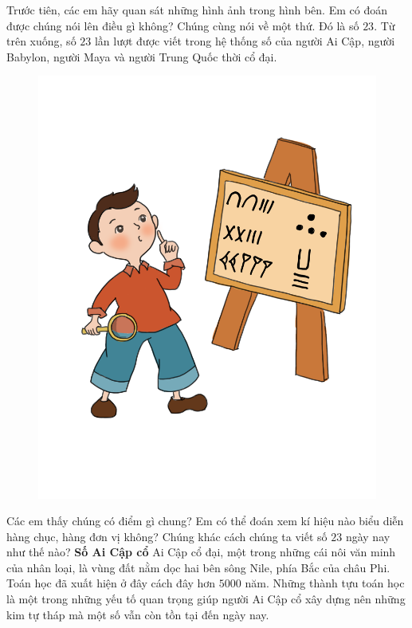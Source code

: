 	Trước tiên, các em hãy quan sát những hình ảnh trong hình bên.  Em có đoán được chúng nói lên điều gì không? Chúng cùng nói về  một thứ. Đó là số $23$. Từ trên xuống, số $23$ lần lượt được viết trong hệ thống số của người Ai Cập, người Babylon, người Maya và người Trung Quốc thời cổ đại. 
	\vskip 0.1cm
		\begin{figure}
		\centering
		\vspace*{-20pt}
		\captionsetup{labelformat= empty, justification=centering}
		\includegraphics[width=1\linewidth]{20.12-pi}
		\vspace*{-35pt}
	\end{figure}
	Các em thấy chúng có điểm gì chung? Em có thể đoán xem kí hiệu nào biểu diễn hàng chục, hàng đơn vị không? Chúng khác cách chúng ta viết số $23$ ngày nay như thế nào?
	\vskip 0.1cm
	\textbf{Số Ai Cập cổ}
	\vskip 0.1cm
	Ai Cập cổ đại, một trong những cái nôi văn minh của nhân loại, là vùng đất nằm dọc hai bên sông Nile, phía Bắc của châu Phi. Toán học đã xuất hiện ở đây cách đây hơn $5000$ năm. Những thành tựu toán học là một trong những yếu tố quan trọng giúp người Ai Cập cổ xây dựng nên những kim tự tháp mà một số vẫn còn tồn tại đến ngày nay. 
